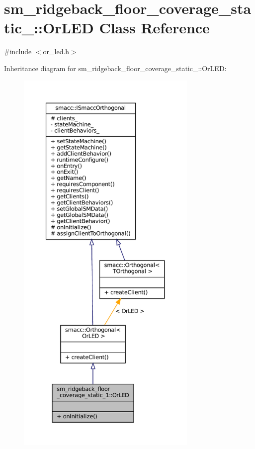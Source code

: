 \hypertarget{classsm__ridgeback__floor__coverage__static__1_1_1OrLED}{}\section{sm\+\_\+ridgeback\+\_\+floor\+\_\+coverage\+\_\+static\+\_\+:\+:Or\+L\+ED Class Reference}
\label{classsm__ridgeback__floor__coverage__static__1_1_1OrLED}


{\ttfamily \#include $<$or\+\_\+led.\+h$>$}



Inheritance diagram for sm\+\_\+ridgeback\+\_\+floor\+\_\+coverage\+\_\+static\+\_\+:\+:Or\+L\+ED\+:
\nopagebreak
\begin{figure}[H]
\begin{center}
\leavevmode
\includegraphics[height=550pt]{classsm__ridgeback__floor__coverage__static__1_1_1OrLED__inherit__graph}
\end{center}
\end{figure}


